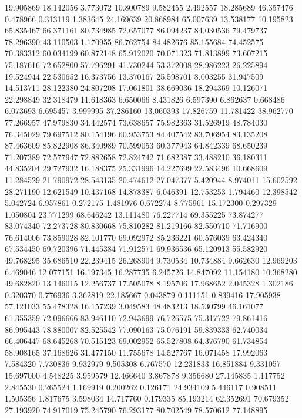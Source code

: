 19.905869
18.142056
3.773072
10.800789
9.582455
2.492557
18.285689
46.357476
0.478966
0.313119
1.383645
24.169639
20.868984
65.007639
13.538177
10.195823
65.835467
66.371161
80.734985
72.657077
86.094237
84.030536
79.479737
78.296390
43.110503
1.170955
86.762754
84.482676
85.155684
74.452575
70.383312
60.034199
60.872148
65.912020
70.071323
71.813899
73.607215
75.187616
72.652800
57.796291
41.730244
53.372008
28.986223
26.225894
19.524944
22.530652
16.373756
13.370167
25.598701
8.003255
31.947509
14.513711
28.122380
24.807208
17.061801
38.669036
18.294369
10.126071
22.298849
32.318479
11.618363
6.650066
8.431826
6.597390
6.862637
0.668486
6.073693
6.695457
3.999995
37.286160
13.060393
17.826759
11.781422
38.962770
77.266957
47.979830
34.442574
73.638657
75.982363
31.526919
48.784030
76.345029
79.697512
80.154196
60.953753
84.407542
83.706954
83.135208
87.463609
85.822908
86.340989
70.599053
60.377943
64.842339
68.650239
71.207389
72.577947
72.882658
72.824742
71.682387
33.488210
36.180311
44.835204
29.727932
16.188375
25.331996
14.227699
22.583496
10.668609
11.284529
21.790972
28.543135
20.474612
27.047377
5.420944
8.974011
15.602592
28.271190
12.621549
10.437168
14.878387
6.046391
12.753253
1.794460
12.398542
5.042724
6.957861
0.272175
1.481976
0.672274
8.775961
15.172300
0.297329
1.050804
23.771299
68.646242
13.111480
76.227714
69.355225
73.874277
83.074340
72.273728
80.830668
75.810282
81.219166
82.550710
71.716900
76.614006
73.859028
82.101770
69.092972
85.236221
60.576039
63.424340
67.534450
69.720396
71.445384
71.912571
69.936536
65.120913
55.582920
49.768295
35.686510
22.239415
26.268904
9.730534
10.734884
9.662630
12.969203
6.469046
12.077151
16.197345
16.287735
6.245726
14.847092
11.154180
10.368280
49.682820
13.146015
12.256737
17.505078
8.195706
17.968652
2.045328
1.302186
0.320370
0.776936
3.362819
22.185667
0.043879
0.111151
0.839416
17.905938
57.121033
55.478328
16.157239
3.049583
48.483213
18.530799
46.161077
61.355359
72.096666
83.946110
72.943699
76.726575
75.317722
79.861416
86.995443
78.880007
82.525542
77.090163
75.076191
59.839333
62.740034
66.406447
68.645268
70.515123
69.002952
65.527808
64.376790
61.734854
58.908165
37.168626
31.477150
11.755678
14.527767
16.071458
17.992063
7.584320
7.730836
9.932979
9.505308
6.767570
12.231833
16.851884
9.331057
15.697000
4.548225
3.959579
12.466640
3.867878
9.356680
27.145835
1.117752
2.845530
0.265524
1.169919
0.200262
0.126171
24.934109
5.446117
0.908511
1.505356
1.817675
3.598034
14.717760
0.179335
85.193214
62.352691
70.679352
27.193920
74.917019
75.245790
76.293177
80.702549
78.570612
77.148895
